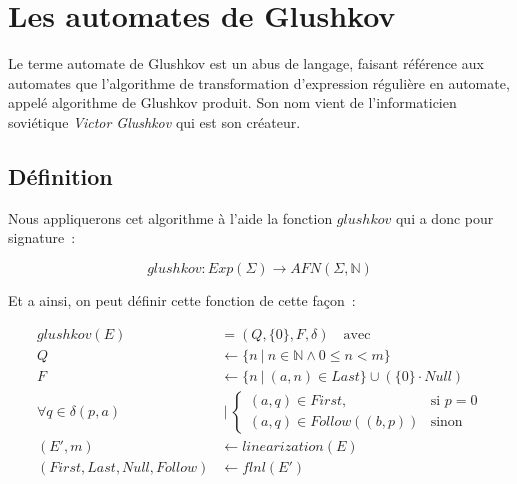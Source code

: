 \section{Les automates de Glushkov}\label{sec:glushkov}

Le terme \og{}automate de Glushkov\fg{} est un abus de langage, faisant
référence aux automates que l'algorithme de transformation d'expression
régulière en automate, appelé algorithme de Glushkov produit. Son nom vient de
l'informaticien soviétique \textit{Victor Glushkov} qui est son créateur.

\subsection{Définition}

Nous appliquerons cet algorithme à l'aide la fonction \(glushkov\) qui a donc
pour signature~:

\[
    glushkov: Exp(\Sigma) \to AFN(\Sigma, \mathbb{N})
\]

Et a ainsi, on peut définir cette fonction de cette façon~:

\begin{align*}
    glushkov     (E)                              & = (Q, \{0\}, F, \delta) \quad \text{avec}                                                                      \\
    Q                                             & \leftarrow \{n ~|~ n \in \mathbb{N} \land 0 \leq n < m\}                                                       \\
    F                                             & \leftarrow \{n ~|~ (a, n) \in Last\} \cup (\{0\} \cdot Null)                                                   \\
    \forall q                    \in \delta(p, a) & ~|~ \begin{cases} (a, q) \in First, & \text{si } p = 0 \\ (a, q) \in Follow((b, p)) & \text{sinon} \end{cases} \\
    (E', m)                                       & \leftarrow linearization(E)                                                                                    \\
    (First, Last, Null, Follow)                   & \leftarrow flnl(E')
\end{align*}

